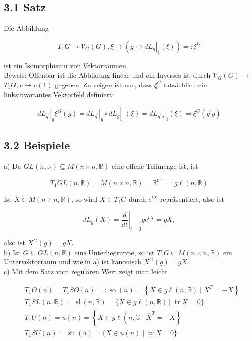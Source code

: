 \documentclass[10pt, letterpaper]{article}
\begin{document}
\subsection*{3.1 Satz}
Die Abbildung

$$
T_{1} G \rightarrow \mathcal{V}_{G}(G), \xi \mapsto\left(\left.g \mapsto d L_{g}\right|_{1}(\xi)\right)=: \xi^{G}
$$

ist ein Isomorphismu von Vektorräumen.\\
Beweis: Offenbar ist die Abbildung linear und ein Inverses ist durch $\mathcal{V}_{G}(G) \rightarrow$ $T_{1} G, v \mapsto v(1)$ gegeben. Zu zeigen ist nur, dass $\xi^{G}$ tatsächlich ein linksinvariantes Vektorfeld definiert:

$$
\left.d L_{g^{\prime}}\right|_{g} \xi^{G}(g)=\left.\left.d L_{g^{\prime}}\right|_{g} \circ d L_{g}\right|_{1}(\xi)=\left.d L_{g^{\prime} g}\right|_{1}(\xi)=\xi^{G}\left(g^{\prime} g\right)
$$

\subsection*{3.2 Beispiele}
a) Da $G L(n, \mathbb{R}) \subseteq M(n \times n, \mathbb{R})$ eine offene Teilmenge ist, ist

$$
T_{1} G L(n, \mathbb{R})=M(n \times n, \mathbb{R})=\mathbb{R}^{n^{2}}=: g \ell(n, \mathbb{R})
$$

Ist $X \in M(n \times n, \mathbb{R})$, so wird $X \in T_{1} G$ durch $e^{t X}$ repräsentiert, also ist

$$
d L_{g}(X)=\left.\frac{d}{d t}\right|_{t=0} g e^{t X}=g X,
$$

also ist $X^{G}(g)=g X$.\\
b) Ist $G \subseteq G L(n, \mathbb{R})$ eine Unterliegruppe, so ist $T_{1} G \subseteq M(n \times n, \mathbb{R})$ ein Untervektorraum und wie in a) ist kanonisch $X^{G}(g)=g X$.\\
c) Mit dem Satz vom regulären Wert zeigt man leicht

$$
\begin{aligned}
& T_{1} O(n)=T_{1} S O(n)=: \operatorname{so}(n)=\left\{X \in g \ell(n, \mathbb{R}) \mid X^{T}=-X\right\} \\
& T_{1} S L(n, \mathbb{R})=\operatorname{sl}(n, \mathbb{R})=\{X \in g \ell(n, \mathbb{R}) \mid \operatorname{tr} X=0\} \\
& T_{1} U(n)=u(n)=\left\{X \in g \ell\left(n, \mathbb{C} \mid \bar{X}^{T}=-X\right\}\right. \\
& T_{1} S U(n)=\operatorname{su}(n)=\{X \in u(n) \mid \operatorname{tr} X=0\}
\end{aligned}
$$
\end{document}
